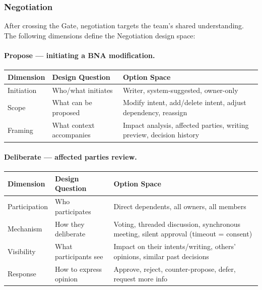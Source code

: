 \subsubsection{Negotiation}
\label{sec:negotiation}

After crossing the Gate, negotiation targets the team's shared understanding. The following dimensions define the Negotiation design space:

\paragraph{Propose --- initiating a BNA modification.}

\begin{table}[h]
\small
\begin{tabular}{@{}lp{2cm}p{4.5cm}@{}}
\toprule
\textbf{Dimension} & \textbf{Design Question} & \textbf{Option Space} \\
\midrule
Initiation & Who/what initiates & Writer, system-suggested, owner-only \\
Scope & What can be proposed & Modify intent, add/delete intent, adjust dependency, reassign \\
Framing & What context accompanies & Impact analysis, affected parties, writing preview, decision history \\
\bottomrule
\end{tabular}
\end{table}

\paragraph{Deliberate --- affected parties review.}

\begin{table}[h]
\small
\begin{tabular}{@{}lp{2cm}p{4.5cm}@{}}
\toprule
\textbf{Dimension} & \textbf{Design Question} & \textbf{Option Space} \\
\midrule
Participation & Who participates & Direct dependents, all owners, all members \\
Mechanism & How they deliberate & Voting, threaded discussion, synchronous meeting, silent approval (timeout = consent) \\
Visibility & What participants see & Impact on their intents/writing, others' opinions, similar past decisions \\
Response & How to express opinion & Approve, reject, counter-propose, defer, request more info \\
\bottomrule
\end{tabular}
\end{table}

